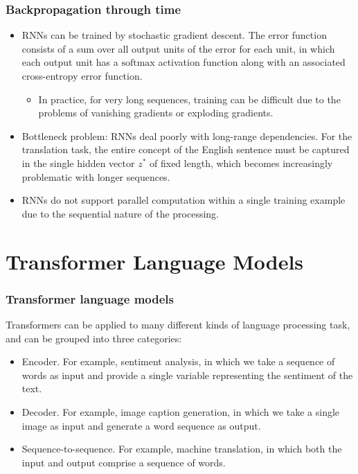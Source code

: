 \documentclass{beamer}
\begin{document}
\begin{frame}
    \frametitle{Backpropagation through time}
    \begin{itemize}
        \item RNNs can be trained by stochastic gradient descent. The error function consists of a sum over all output units of the error for each unit, in which each output unit has a $\mathrm{softmax}$ activation function along with an associated cross-entropy error function.
        \begin{itemize}
            \item In practice, for very long sequences, training can be difficult due to the problems of vanishing gradients or exploding gradients.
        \end{itemize}
        \item Bottleneck problem: RNNs deal poorly with long-range dependencies. For the translation task, the entire concept of the English sentence must be captured in the single hidden vector $z^{*}$ of fixed length, which becomes increasingly problematic with longer sequences.
        \item RNNs do not support parallel computation within a single training example due to the sequential nature of the processing.
    \end{itemize}
\end{frame}

\section{Transformer Language Models}

\begin{frame}
    \frametitle{Transformer language models}
    Transformers can be applied to many different kinds of language processing task, and can be grouped into three categories:
    \begin{itemize}
        \item Encoder. For example, sentiment analysis, in which we take a sequence of words as input and provide a single variable representing the sentiment of the text.
        \item Decoder. For example, image caption generation, in which we take a single image as input and generate a word sequence as output.
        \item Sequence-to-sequence. For example, machine translation, in which both the input and output comprise a sequence of words.
    \end{itemize}
\end{frame}
\end{document}
